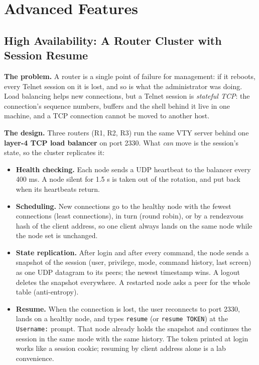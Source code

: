 \documentclass[11pt,a4paper]{article}
\begin{document}
\section{Advanced Features}

\subsection{High Availability: A Router Cluster with Session Resume}
\textbf{The problem.} A router is a single point of failure for management: if it reboots, every Telnet session on it is lost, and so is what the administrator was doing. Load balancing helps new connections, but a Telnet session is \emph{stateful TCP}: the connection's sequence numbers, buffers and the shell behind it live in one machine, and a TCP connection cannot be moved to another host.

\textbf{The design.} Three routers (R1, R2, R3) run the same VTY server behind one \textbf{layer-4 TCP load balancer} on port 2330. What \emph{can} move is the session's state, so the cluster replicates it:
\begin{itemize}[leftmargin=2em]
    \item \textbf{Health checking.} Each node sends a UDP heartbeat to the balancer every 400 ms. A node silent for 1.5 s is taken out of the rotation, and put back when its heartbeats return.
    \item \textbf{Scheduling.} New connections go to the healthy node with the fewest connections (least connections), in turn (round robin), or by a rendezvous hash of the client address, so one client always lands on the same node while the node set is unchanged.
    \item \textbf{State replication.} After login and after every command, the node sends a snapshot of the session (user, privilege, mode, command history, last screen) as one UDP datagram to its peers; the newest timestamp wins. A logout deletes the snapshot everywhere. A restarted node asks a peer for the whole table (anti-entropy).
    \item \textbf{Resume.} When the connection is lost, the user reconnects to port 2330, lands on a healthy node, and types \texttt{resume} (or \texttt{resume TOKEN}) at the \texttt{Username:} prompt. That node already holds the snapshot and continues the session in the same mode with the same history. The token printed at login works like a session cookie; resuming by client address alone is a lab convenience.
\end{itemize}
\end{document}
